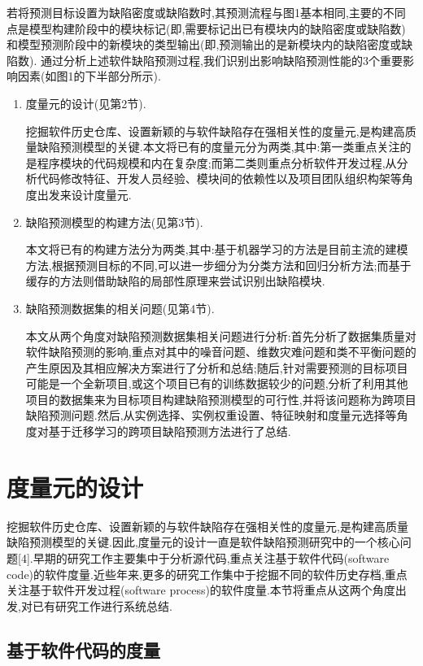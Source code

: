\documentclass{rjthesis}
\begin{document}
	若将预测目标设置为缺陷密度或缺陷数时,其预测流程与图1基本相同,主要的不同点是模型构建阶段中的模块标记(即,需要标记出已有模块内的缺陷密度或缺陷数)和模型预测阶段中的新模块的类型输出(即,预测输出的是新模块内的缺陷密度或缺陷数).
	通过分析上述软件缺陷预测过程,我们识别出影响缺陷预测性能的3个重要影响因素(如图1的下半部分所示).
		
		\begin{enumerate}
			\item 度量元的设计(见第2节).
			
			挖掘软件历史仓库、设置新颖的与软件缺陷存在强相关性的度量元,是构建高质量缺陷预测模型的关键.本文将已有的度量元分为两类,其中:第一类重点关注的是程序模块的代码规模和内在复杂度;而第二类则重点分析软件开发过程,从分析代码修改特征、开发人员经验、模块间的依赖性以及项目团队组织构架等角度出发来设计度量元.
			\item 缺陷预测模型的构建方法(见第3节).
			
			本文将已有的构建方法分为两类,其中:基于机器学习的方法是目前主流的建模方法,根据预测目标的不同,可以进一步细分为分类方法和回归分析方法;而基于缓存的方法则借助缺陷的局部性原理来尝试识别出缺陷模块.
			\item 缺陷预测数据集的相关问题(见第4节).
			
			本文从两个角度对缺陷预测数据集相关问题进行分析:首先分析了数据集质量对软件缺陷预测的影响,重点对其中的噪音问题、维数灾难问题和类不平衡问题的产生原因及其相应解决方案进行了分析和总结;随后,针对需要预测的目标项目可能是一个全新项目,或这个项目已有的训练数据较少的问题,分析了利用其他项目的数据集来为目标项目构建缺陷预测模型的可行性,并将该问题称为跨项目缺陷预测问题.然后,从实例选择、实例权重设置、特征映射和度量元选择等角度对基于迁移学习的跨项目缺陷预测方法进行了总结.
		\end{enumerate}
	
	\section{度量元的设计}
	
	挖掘软件历史仓库、设置新颖的与软件缺陷存在强相关性的度量元,是构建高质量缺陷预测模型的关键.因此,度量元的设计一直是软件缺陷预测研究中的一个核心问题[4].早期的研究工作主要集中于分析源代码,重点关注基于软件代码(software code)的软件度量.近些年来,更多的研究工作集中于挖掘不同的软件历史存档,重点关注基于软件开发过程(software process)的软件度量.本节将重点从这两个角度出发,对已有研究工作进行系统总结.
	
	\subsection{基于软件代码的度量}
	
\end{document}
